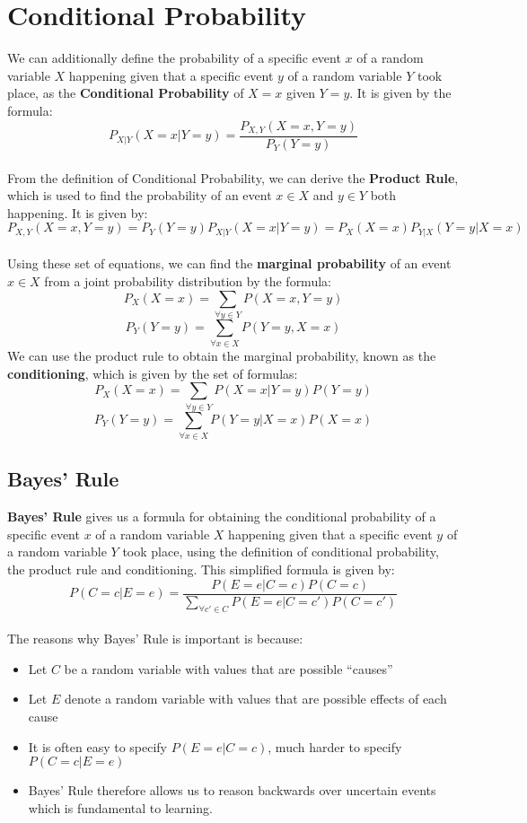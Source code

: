 \documentclass[12pt, a4paper]{book}
\begin{document}
\section{Conditional Probability}
We can additionally define the probability of a specific event $x$ of a random variable $X$ happening given that a specific event $y$ of a random variable $Y$ took place, as the \textbf{Conditional Probability} of $X=x$ given $Y=y$. It is given by the formula:
$$P_{X|Y}(X=x|Y=y) = \frac{P_{X,Y}(X=x,Y=y)}{P_Y(Y=y)}$$\\
From the definition of Conditional Probability, we can derive the \textbf{Product Rule}, which is used to find the probability of an event $x \in X$ and $y \in Y$ both happening. It is given by:
$$P_{X,Y}(X=x,Y=y) = P_Y(Y=y)P_{X|Y}(X=x|Y=y)  = P_X(X=x)P_{Y|X}(Y=y|X=x)$$\\
Using these set of equations, we can find the \textbf{marginal probability} of an event $x \in X$ from a joint probability distribution by the formula:
$$P_X(X=x) = \sum_{\forall y \in Y}P(X=x, Y=y)$$
$$P_Y(Y=y) = \sum_{\forall x \in X}P(Y=y, X=x)$$
We can use the product rule to obtain the marginal probability, known as the \textbf{conditioning}, which is given by the set of formulas:
$$P_X(X=x) = \sum_{\forall y \in Y}P(X=x| Y=y)P(Y=y)$$
$$P_Y(Y=y) = \sum_{\forall x \in X}P(Y=y| X=x)P(X=x)$$

\subsection{Bayes' Rule}
\textbf{Bayes' Rule} gives us a formula for obtaining the conditional probability of a specific event $x$ of a random variable $X$ happening given that a specific event $y$ of a random variable $Y$ took place, using the definition of conditional probability, the product rule and conditioning. This simplified formula is given by:
$$P(C=c|E=e) = \frac{P(E=e|C=c)P(C=c)}{\sum_{\forall c' \in C}P(E=e| C=c')P(C=c')}$$\\
The reasons why Bayes' Rule is important is because:
\begin{itemize}
    \item Let $C$ be a random variable with values that are possible “causes”
    \item Let $E$ denote a random variable with values that are possible effects of each cause
    \item  It is often easy to specify $P(E=e|C=c)$, much harder to specify $P(C=c|E=e)$
    \item Bayes’ Rule therefore allows us to reason backwards over uncertain events which is fundamental to learning.
\end{itemize}
\end{document}
